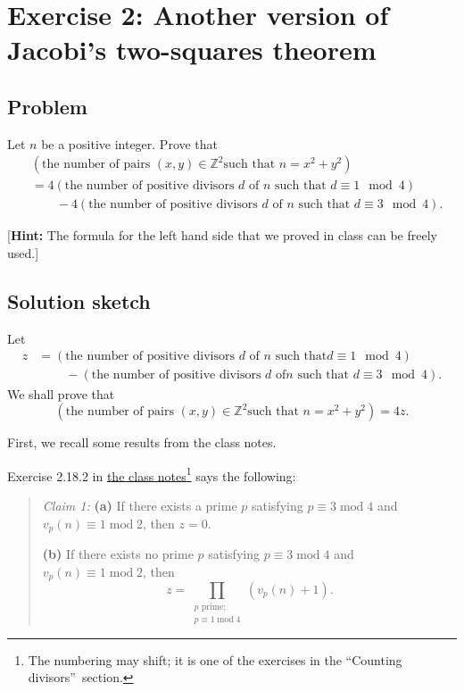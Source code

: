 \documentclass[paper=a4, fontsize=12pt]{scrartcl}%
\let\prodnonlimits\prod
\renewcommand{\prod}{\prodnonlimits\limits}
\theoremstyle{plainsl}
\theoremstyle{definition}
\theoremstyle{remark}
\newenvironment{statement}{\begin{quote}}{\end{quote}}
\begin{document}
\section{Exercise 2: Another version of Jacobi's two-squares theorem}

\subsection{Problem}

Let $n$ be a positive integer. Prove that
\begin{align*}
&  \left(  \text{the number of pairs $\left(  x, y \right)  \in\mathbb{Z}^{2}$
such that $n = x^{2} + y^{2}$} \right) \\
&  = 4 \left(  \text{the number of positive divisors $d$ of $n$ such that $d
\equiv1 \mod 4$} \right) \\
&  \qquad- 4 \left(  \text{the number of positive divisors $d$ of $n$ such
that $d \equiv3 \mod 4$} \right)  .
\end{align*}


[\textbf{Hint:} The formula for the left hand side that we proved in class can
be freely used.]

\subsection{Solution sketch}

Let
\begin{align}
z  &  =\left(  \text{the number of positive divisors $d$ of $n$ such that
$d\equiv1\mod 4$}\right) \nonumber\\
&  \ \ \ \ \ \ \ \ \ \ -\left(  \text{the number of positive divisors $d$ of
$n$ such that $d\equiv3\mod 4$}\right)  . \label{sol.Z[i].xx+yy.jac-num.z=}%
\end{align}
We shall prove that%
\begin{equation}
\left(  \text{the number of pairs }\left(  x,y\right)  \in\mathbb{Z}^{2}\text{
such that }n=x^{2}+y^{2}\right)  =4z. \label{sol.Z[i].xx+yy.jac-num.goal}%
\end{equation}


First, we recall some results from the class notes.

Exercise 2.18.2 in
\href{http://www.cip.ifi.lmu.de/~grinberg/t/19s/notes.pdf}{the class
notes}\footnote{The numbering may shift; it is one of the exercises in the
\textquotedblleft Counting divisors\textquotedblright\ section.} says the following:

\begin{statement}
\textit{Claim 1:} \textbf{(a)} If there exists a prime $p$ satisfying
$p\equiv3\operatorname{mod}4$ and $v_{p}\left(  n\right)  \equiv
1\operatorname{mod}2$, then $z=0$.

\textbf{(b)} If there exists no prime $p$ satisfying $p\equiv
3\operatorname{mod}4$ and $v_{p}\left(  n\right)  \equiv1\operatorname{mod}2$,
then
\[
z=\prod_{\substack{p\text{ prime;}\\p\equiv1\operatorname{mod}4}}\left(
v_{p}\left(  n\right)  +1\right)  .
\]

\end{statement}
\end{document}
